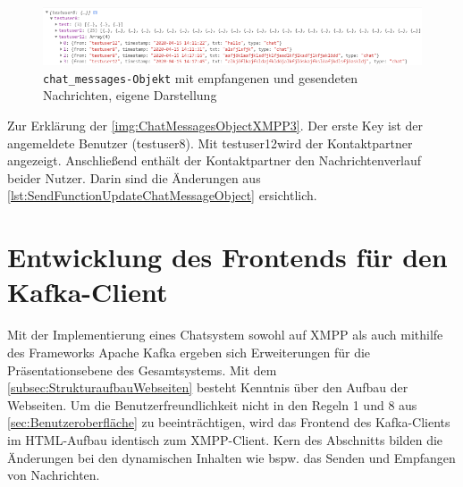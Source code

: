 \documentclass[a4paper,titlepage,halfparskip,12pt]{scrreprt}
\begin{document}
\begin{onehalfspacing}
\begin{figure}[h]
	\centering
	\includegraphics[width=\textwidth]{images/ChatMessagesObjectXMPP3}
	\caption{\texttt{chat\_messages-Objekt} mit empfangenen und gesendeten Nachrichten, eigene Darstellung}
	\label{img:ChatMessagesObjectXMPP3}
\end{figure}
Zur Erklärung der \autoref{img:ChatMessagesObjectXMPP3}. Der erste Key ist der angemeldete Benutzer (\glqq testuser8\grqq). Mit \glqq testuser12\grqq wird der Kontaktpartner angezeigt. Anschließend enthält der Kontaktpartner den Nachrichtenverlauf beider Nutzer. Darin sind die Änderungen aus \autoref{lst:SendFunctionUpdateChatMessageObject} ersichtlich. 
\newpage

\chapter{Entwicklung des Frontends für den Kafka-Client}
\label{sec:FrontendKafka}
Mit der Implementierung eines Chatsystem sowohl auf XMPP als auch mithilfe des Frameworks Apache Kafka ergeben sich Erweiterungen für die Präsentationsebene des Gesamtsystems. Mit dem \autoref{subsec:StrukturaufbauWebseiten} besteht Kenntnis über den Aufbau der Webseiten. Um die Benutzerfreundlichkeit nicht in den Regeln 1 und 8 aus \autoref{sec:Benutzeroberfläche} zu beeinträchtigen, wird das Frontend des Kafka-Clients im HTML-Aufbau identisch zum XMPP-Client. Kern des Abschnitts bilden die Änderungen bei den dynamischen Inhalten wie bspw. das Senden und Empfangen von Nachrichten.


\end{onehalfspacing}
\end{document}
